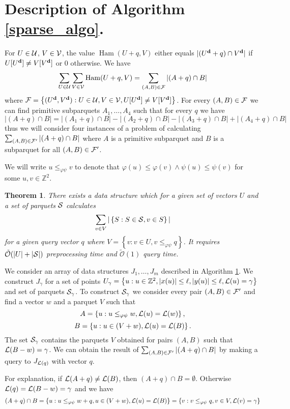 \documentclass[11pt]{article}
\newcommand{\Z}{\mathbb{Z}}
\newcommand{\tO}{\tilde{\mathcal{O}}}
\renewcommand{\phi}{\varphi}
\newcommand{\set}[1]{\left\lbrace #1 \right\rbrace}
\DeclareMathOperator*{\Ham}{Ham}
\theoremstyle{plain}
\newtheorem{theorem}{Theorem}
\theoremstyle{definition}
\begin{document}
\section{Description of Algorithm \ref{sparse_algo}.}


For $U \in \U$, $V \in \V$, the value $ \Ham(U + q, V)$ either equals $|(\d{U} + q) \cap \d{V}|$ if $U[\d{U}] \neq V[\d{V}]$ or $0$ otherwise.
We have
$$ \sum_{U \in \U} \sum_{V \in \V} \Ham(U + q, V) = \sum_{(A, B) \in \F} |(A + q) \cap B| $$
where $ \F = \set{(\d{U}, \d{V}) : U \in \U, V \in \V, U[\d{U}] \neq V[\d{V}]} $. 
For every $(A, B) \in \F$ we can find primitive subparquets $A_1, \dots, A_4$ such that for every $q$ we have
$$ |(A + q) \cap B| = |(A_1 + q) \cap B| - |(A_2 + q) \cap B| - |(A_3 + q) \cap B| + |(A_4 + q) \cap B| $$
thus we will consider four instances of a problem of calculating $\sum_{(A, B) \in \F'} |(A + q) \cap B|$ where $A$ is a primitive subparquet and $B$ is a subparquet for all $(A, B) \in \F'$.

We will write $u \le_{\phi\psi} v$ to denote that $\phi(u) \le \phi(v) \wedge \psi(u) \le \psi(v)$ for some $u, v \in \Z^2$.


\begin{theorem}
	\label{sweeper}
	There exists a data structure which for a given set of vectors $U$ and a set of parquets $\S$ calculates
	$$ \sum_{v \in V} |\set{S : S \in \S, v \in S}| $$
	for a given query vector $q$ where $V = \set{v : v \in U, v \le_{\phi\psi} q}$.
	It requires $\tO(|U| + |\S|)$ preprocessing time and $\tO(1)$ query time.
\end{theorem}


We consider an array of data structures $J_1, \dots, J_m$ described in Algorithm \ref{sweeper}.
We construct $J_\gamma$ for a set of points $U_\gamma = \set{u : u \in \Z^2, |x(u)| \le \ell, |y(u)| \le \ell, \L(u) = \gamma}$ and set of parquets $\S_\gamma$.
To construct $\S_\gamma$ we consider every pair $(A, B) \in \F'$ and find a vector $w$ and a parquet $V$ such that 
$$ A = \set{u : u \le_{\phi\psi} w, \L(u) = \L(w)},$$
$$ B = \set{u : u \in (V + w), \L(u) = \L(B)}.$$
The set $\S_\gamma$ contains the parquets $V$ obtained for pairs $(A, B)$ such that $\L(B - w) = \gamma$.
We can obtain the result of $\sum_{(A, B) \in \F'} |(A + q) \cap B|$ by making a query to $J_{\L(q)}$ with vector $q$.

For explanation, if $\L(A + q) \neq \L(B)$, then $(A + q) \cap B = \emptyset$.
Otherwise $\L(q) = \L(B - w) = \gamma$ and we have
$$ (A + q) \cap B = \set{u : u \le_{\phi\psi} w + q, u \in (V + w), \L(u) = \L(B)} = \set{v : v \le_{\phi\psi} q, v \in V, \L(v) = \gamma} $$
\end{document}
